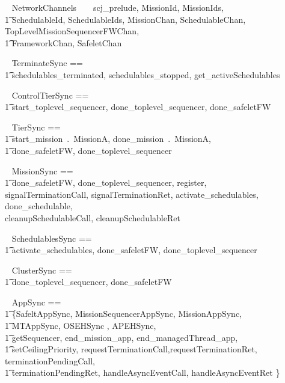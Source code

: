 

\begin{zsection}
	\SECTION ~ NetworkChannels ~ \parents ~ scj\_prelude, MissionId, MissionIds, \\
		\t1 SchedulableId, SchedulableIds, MissionChan, SchedulableChan, TopLevelMissionSequencerFWChan,\\
		\t1 FrameworkChan, SafeletChan
\end{zsection}
%
\begin{circus}
\circchannelset ~ TerminateSync == \\ \t1 \lchanset schedulables\_terminated, schedulables\_stopped, get\_activeSchedulables \rchanset
\end{circus}
%
\begin{circus}
\circchannelset ~ ControlTierSync ==\\ \t1 \lchanset start\_toplevel\_sequencer, done\_toplevel\_sequencer, done\_safeletFW \rchanset
\end{circus}
\begin{circus}
\circchannelset ~ TierSync == \\ \t1 \lchanset start\_mission~.~MissionA, done\_mission~.~MissionA,\\
	\t1 done\_safeletFW, done\_toplevel\_sequencer \rchanset
\end{circus}
%
\begin{circus}
\circchannelset ~ MissionSync == \\ \t1 \lchanset done\_safeletFW, done\_toplevel\_sequencer, register, \\
                 signalTerminationCall, signalTerminationRet, activate\_schedulables, done\_schedulable, \\
                 cleanupSchedulableCall, cleanupSchedulableRet  \rchanset
\end{circus}
%
\begin{circus}
\circchannelset ~ SchedulablesSync == \\ \t1 \lchanset activate\_schedulables, done\_safeletFW, done\_toplevel\_sequencer \rchanset
\end{circus}
%
\begin{circus}
\circchannelset ~ ClusterSync == \\ \t1 \lchanset done\_toplevel\_sequencer, done\_safeletFW \rchanset
\end{circus}
%
\begin{circus}
\circchannelset ~ AppSync == \\ \t1  \bigcup \{SafeltAppSync, MissionSequencerAppSync, MissionAppSync, \\ \t1 MTAppSync, OSEHSync , APEHSync,  \\ \t1
	\lchanset getSequencer, end\_mission\_app, end\_managedThread\_app, \\ \t1 setCeilingPriority, requestTerminationCall,requestTerminationRet, terminationPendingCall, \\ \t1 terminationPendingRet, handleAsyncEventCall, handleAsyncEventRet \rchanset  \}
\end{circus}
